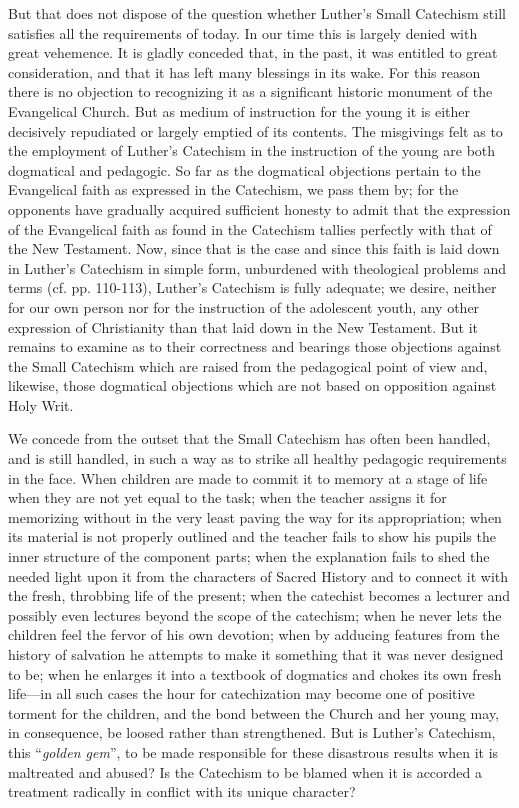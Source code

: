 But that does not dispose of the question whether Luther’s Small Catechism still satisfies all the requirements of today. In our time this is largely denied with great vehemence. It is gladly conceded that, in the past, it was entitled to great consideration, and that it has left many blessings in its wake. For this reason there is no objection to recognizing it as a significant historic monument of the Evangelical Church. But as medium of instruction for the young it is either decisively repudiated or largely emptied of its contents. The misgivings felt as to the employment of Luther’s Catechism in the instruction of the young are both dogmatical and pedagogic. So far as the dogmatical objections pertain to the Evangelical faith as expressed in the Catechism, we pass them by; for the opponents have gradually acquired sufficient honesty to admit that the expression of the Evangelical faith as found in the Catechism tallies perfectly with that of the New Testament. Now, since that is the case and since this faith is laid down in Luther’s Catechism in simple form, unburdened with theological problems and terms (cf. pp. 110-113), Luther’s Catechism is fully adequate; we desire, neither for our own person nor for the instruction of the adolescent youth, any other expression of Christianity than that laid down in the New Testament. But it remains to examine as to their correctness and bearings those objections against the Small Catechism which are raised from the pedagogical point of view and, likewise, those dogmatical objections which are not based on opposition against Holy Writ.

We concede from the outset that the Small Catechism has often been handled, and is still handled, in such a way as to strike all healthy pedagogic requirements in the face. When children are made to commit
it to memory at a stage of life when they are not yet equal to the task; when the teacher assigns it for memorizing without in the very least paving the way for its appropriation; when its material is not properly outlined and the teacher fails to show his pupils the inner structure of the component parts; when the explanation fails to shed the needed light upon it from the characters of Sacred History and to connect it with the fresh, throbbing life of the present; when the catechist becomes a lecturer and possibly even lectures beyond the scope of the catechism; when he never lets the children feel the fervor of his own devotion; when by adducing features from the history of salvation he attempts to make it something that it was never designed to be; when he enlarges it into a textbook of dogmatics and chokes its own fresh life—in all such cases the hour for catechization may become one of positive torment for the children, and the bond between the Church and her young may, in consequence, be loosed rather than strengthened. But is Luther’s Catechism, this “\emph{golden gem}”, to be made responsible for these disastrous results when it is maltreated and abused? Is the Catechism to be blamed when it is accorded a treatment radically in conflict with its unique character?

